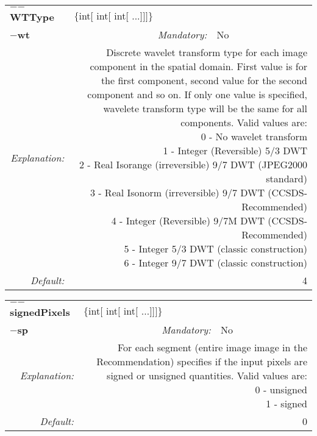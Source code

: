 \begin{center}\begin{tabular}{|rr|rlrl|}
\hline
\multicolumn{2}{|l|}{\textbf{$-$$-$WTType}} & \multicolumn{4}{|l|}{$\{$int$[$ int$[$ int$[$ ...$]$$]$$]$$\}$} \\
\cline{3-6}
\multicolumn{2}{|l|}{\textbf{$-$wt}} & \emph{Mandatory:} & No & &  \\
\hline
\emph{Explanation:} & \multicolumn{5}{|p{12cm}|}{Discrete wavelet transform type for each image component in the spatial domain. First value is for the first component, second value for the second component and so on. If only one value is specified, wavelete transform type will be the same for all components. Valid values are:\newline 0 - No wavelet transform \newline 1 - Integer (Reversible) 5/3 DWT \newline 2 - Real Isorange (irreversible) 9/7 DWT (JPEG2000 standard) \newline 3 - Real Isonorm (irreversible) 9/7 DWT (CCSDS-Recommended) \newline 4 - Integer (Reversible) 9/7M DWT (CCSDS-Recommended) \newline 5 - Integer 5/3 DWT (classic construction) \newline 6 - Integer 9/7 DWT (classic construction)} \\
\hline
\emph{Default:} & \multicolumn{5}{|p{12cm}|}{4 } \\
\hline
\end{tabular}\end{center}
\begin{center}\begin{tabular}{|rr|rlrl|}
\hline
\multicolumn{2}{|l|}{\textbf{$-$$-$signedPixels}} & \multicolumn{4}{|l|}{$\{$int$[$ int$[$ int$[$ ...$]$$]$$]$$\}$} \\
\cline{3-6}
\multicolumn{2}{|l|}{\textbf{$-$sp}} & \emph{Mandatory:} & No & &  \\
\hline
\emph{Explanation:} & \multicolumn{5}{|p{12cm}|}{For each segment (entire image image in the Recommendation) specifies if the input pixels are signed or unsigned quantities. Valid values are:\newline 0 - unsigned \newline 1 - signed} \\
\hline
\emph{Default:} & \multicolumn{5}{|p{12cm}|}{0 } \\
\hline
\end{tabular}\end{center}
